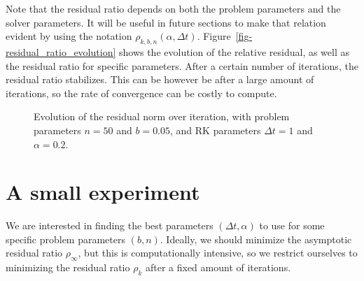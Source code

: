\documentclass[
  letterpaper,
]{report}
\theoremstyle{definition}
\theoremstyle{plain}
\theoremstyle{definition}
\theoremstyle{remark}
\begin{document}
Note that the residual ratio depends on both the problem parameters and
the solver parameters. It will be useful in future sections to make that
relation evident by using the notation
\(\rho_{k,b,n}(\alpha, \Delta t)\).
Figure~\ref{fig-residual_ratio_evolution} shows the evolution of the
relative residual, as well as the residual ratio for specific
parameters. After a certain number of iterations, the residual ratio
stabilizes. This can be however be after a large amount of iterations,
so the rate of convergence can be costly to compute.

\begin{figure}


\caption{\label{fig-residual\_ratio\_evolution}Evolution of the residual
norm over iteration, with problem parameters \(n = 50\) and
\(b = 0.05\), and RK parameters \(\Delta t = 1\) and \(\alpha = 0.2\).}

\end{figure}%

\section{A small experiment}\label{sec-small_experiment}

We are interested in finding the best parameters \((\Delta t, \alpha)\)
to use for some specific problem parameters \((b,n)\). Ideally, we
should minimize the asymptotic residual ratio \(\rho_\infty\), but this
is computationally intensive, so we restrict ourselves to minimizing the
residual ratio \(\rho_k\) after a fixed amount of iterations.
\end{document}

